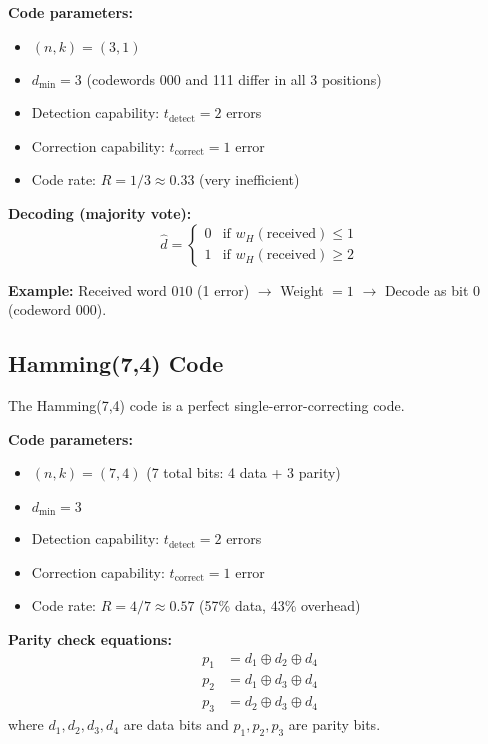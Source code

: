 \textbf{Code parameters:}
\begin{itemize}
\item $(n, k) = (3, 1)$
\item $d_{\min} = 3$ (codewords 000 and 111 differ in all 3 positions)
\item Detection capability: $t_{\text{detect}} = 2$ errors
\item Correction capability: $t_{\text{correct}} = 1$ error
\item Code rate: $R = 1/3 \approx 0.33$ (very inefficient)
\end{itemize}

\textbf{Decoding (majority vote):}
\begin{equation}
\hat{d} = \begin{cases}
0 & \text{if } w_H(\text{received}) \leq 1 \\
1 & \text{if } w_H(\text{received}) \geq 2
\end{cases}
\label{eq:majority-vote}
\end{equation}

\textbf{Example:} Received word $010$ (1 error) $\rightarrow$ Weight $= 1$ $\rightarrow$ Decode as bit 0 (codeword 000).

\subsection{Hamming(7,4) Code}

The Hamming(7,4) code is a perfect single-error-correcting code.

\textbf{Code parameters:}
\begin{itemize}
\item $(n, k) = (7, 4)$ (7 total bits: 4 data + 3 parity)
\item $d_{\min} = 3$
\item Detection capability: $t_{\text{detect}} = 2$ errors
\item Correction capability: $t_{\text{correct}} = 1$ error
\item Code rate: $R = 4/7 \approx 0.57$ (57\% data, 43\% overhead)
\end{itemize}

\textbf{Parity check equations:}
\begin{align}
p_1 &= d_1 \oplus d_2 \oplus d_4 \label{eq:hamming-p1} \\
p_2 &= d_1 \oplus d_3 \oplus d_4 \label{eq:hamming-p2} \\
p_3 &= d_2 \oplus d_3 \oplus d_4 \label{eq:hamming-p3}
\end{align}
where $d_1, d_2, d_3, d_4$ are data bits and $p_1, p_2, p_3$ are parity bits.

